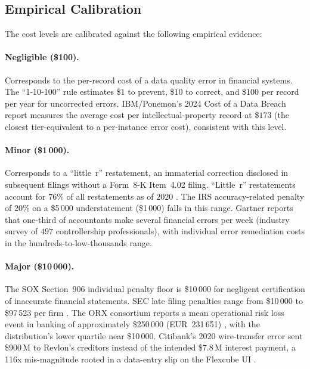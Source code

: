 \subsection{Empirical Calibration}
\label{sec:empirical-calibration}

The cost levels are calibrated against the following empirical evidence:

\paragraph{Negligible (\$100).}
Corresponds to the per-record cost of a data quality error in financial
systems. The \enquote{1-10-100} rule \citep{labovitz1992,redman1998cacm}
estimates \$$1$ to prevent, \$$10$ to correct, and \$$100$ per
record per year for uncorrected errors. IBM/Ponemon's 2024 Cost of a Data Breach report measures the
average cost per intellectual-property record at \$$173$
\citep{ponemon2024} (the closest tier-equivalent to a per-instance
error cost),
consistent with this level.

\paragraph{Minor (\$1\,000).}
Corresponds to a \enquote{little~r} restatement, an immaterial correction
disclosed in subsequent filings without a Form~8-K Item~4.02 filing.
\enquote{Little~r} restatements account for $76\%$ of all
restatements as of $2020$ \citep{sec2022munter,wilmerhale2022}. The IRS accuracy-related penalty of 20\%
on a \$5\,000 understatement (\$1\,000) falls in this range. Gartner
reports that one-third of accountants make several financial errors per
week \citep{gartner2024accounting} (industry survey of $497$
controllership professionals), with individual error remediation
costs in the hundreds-to-low-thousands range.

\paragraph{Major (\$10\,000).}
The SOX Section~906 individual penalty floor is \$10\,000 for negligent
certification of inaccurate financial statements. SEC late filing
penalties range from \$10\,000 to \$97\,523 per firm
\citep{sec2025latefiling}. The ORX consortium reports a mean operational
risk loss event in banking of approximately \$250\,000 (EUR~231\,651)
\citep{orx2023}, with the distribution's lower quartile near \$10\,000.
Citibank's 2020 wire-transfer error sent \$$900$\,M to Revlon's
creditors instead of the intended \$$7.8$\,M interest payment, a
116x mis-magnitude rooted in a data-entry slip on the Flexcube UI
\citep{defontenay2021citibank}.

